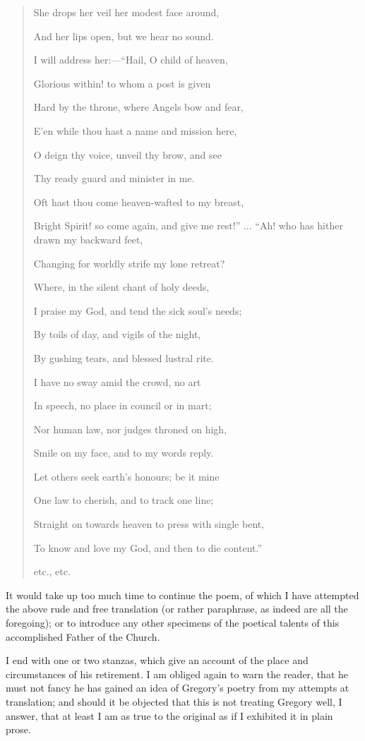 \begin{quote}
She drops her veil her modest face around,

And her lips open, but we hear no sound.

I will address her:—``Hail, O child of heaven,

Glorious within! to whom a post is given

Hard by the throne, where Angels bow and fear,

E'en while thou hast a name and mission here,

O deign thy voice, unveil thy brow, and see

Thy ready guard and minister in me.

Oft hast thou come heaven-wafted to my breast,

Bright Spirit! so come again, and give me rest!''
... ``Ah! who has hither drawn my backward feet,

Changing for worldly strife my lone retreat?

Where, in the silent chant of holy deeds,

I praise my God, and tend the sick soul's needs;

By toils of day, and vigils of the night,

By gushing tears, and blessed lustral rite. 

I have no sway amid the crowd, no art

In speech, no place in council or in mart;

Nor human law, nor judges throned on high,

Smile on my face, and to my words reply.

Let others seek earth's honours; be it mine

One law to cherish, and to track one line;

Straight on towards heaven to press with single bent,

To know and love my God, and then to die content.''

etc., etc.

\end{quote}

It would take up too much time to continue the poem, of which I
have attempted the above rude and free translation (or rather
paraphrase, as indeed are all the foregoing); or to introduce any
other specimens of the poetical talents of this accomplished Father of
the Church.

I end with one or two stanzas, which give an account of the place
and circumstances of his retirement. I am obliged again to warn the
reader, that he must not fancy he has gained an idea of Gregory's
poetry from my attempts at translation; and should it be objected that
this is not treating Gregory well, I answer, that at least I am as
true to the original as if I exhibited it in plain prose.

